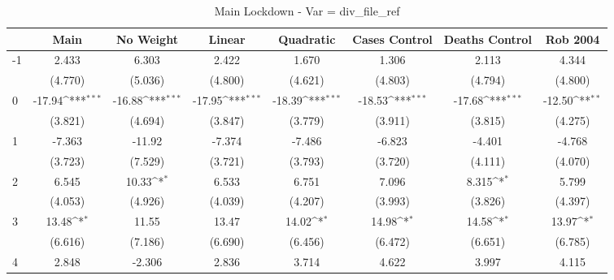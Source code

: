 \documentclass{article}
\begin{document}
{
\def\sym#1{\ifmmode^{#1}\else\(^{#1}\)\fi}
\begin{longtable}{l*{7}{c}}
\caption{Main Lockdown - Var = div\_file\_ref}\\
\hline\hline\endfirsthead\hline\endhead\hline\endfoot\endlastfoot
                &\multicolumn{1}{c}{Main}&\multicolumn{1}{c}{No Weight}&\multicolumn{1}{c}{Linear}&\multicolumn{1}{c}{Quadratic}&\multicolumn{1}{c}{Cases Control}&\multicolumn{1}{c}{Deaths Control}&\multicolumn{1}{c}{Rob 2004}\\
\hline
-1              &    2.433         &    6.303         &    2.422         &    1.670         &    1.306         &    2.113         &    4.344         \\
                &  (4.770)         &  (5.036)         &  (4.800)         &  (4.621)         &  (4.803)         &  (4.794)         &  (4.800)         \\
0               &   -17.94\sym{***}&   -16.88\sym{***}&   -17.95\sym{***}&   -18.39\sym{***}&   -18.53\sym{***}&   -17.68\sym{***}&   -12.50\sym{**} \\
                &  (3.821)         &  (4.694)         &  (3.847)         &  (3.779)         &  (3.911)         &  (3.815)         &  (4.275)         \\
1               &   -7.363         &   -11.92         &   -7.374         &   -7.486         &   -6.823         &   -4.401         &   -4.768         \\
                &  (3.723)         &  (7.529)         &  (3.721)         &  (3.793)         &  (3.720)         &  (4.111)         &  (4.070)         \\
2               &    6.545         &    10.33\sym{*}  &    6.533         &    6.751         &    7.096         &    8.315\sym{*}  &    5.799         \\
                &  (4.053)         &  (4.926)         &  (4.039)         &  (4.207)         &  (3.993)         &  (3.826)         &  (4.397)         \\
3               &    13.48\sym{*}  &    11.55         &    13.47         &    14.02\sym{*}  &    14.98\sym{*}  &    14.58\sym{*}  &    13.97\sym{*}  \\
                &  (6.616)         &  (7.186)         &  (6.690)         &  (6.456)         &  (6.472)         &  (6.651)         &  (6.785)         \\
4               &    2.848         &   -2.306         &    2.836         &    3.714         &    4.622         &    3.997         &    4.115         \\

\end{longtable}}
\end{document}
